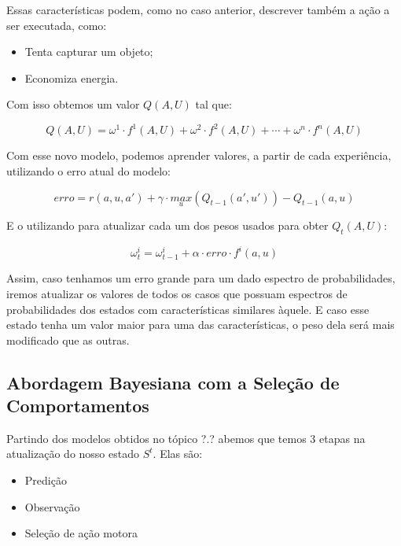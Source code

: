 Essas características podem, como no caso anterior, descrever também a ação a ser executada, como:

\begin{itemize}
	\item Tenta capturar um objeto;
	\item Economiza energia.
\end{itemize}

Com isso obtemos um valor $ Q \left( A, U \right) $ tal que:

\begin{equation}
	Q \left( A, U \right) = \omega^1 \cdot f^1 \left( A, U \right) + \omega^2 \cdot f^2 \left( A, U \right) + \cdots + \omega^n \cdot f^n \left( A, U \right)
\end{equation}


Com esse novo modelo, podemos aprender valores, a partir de cada experiência, utilizando o erro atual do modelo:

\begin{equation}
	erro = r \left( a, u, a' \right) + \gamma \cdot \underset{u}{max} \left( Q_{t-1} \left( a', u' \right) \right) - Q_{t-1} \left( a, u \right)
\end{equation}

E o utilizando para atualizar cada um dos pesos usados para obter $ Q_t \left( A, U \right) $:

\begin{equation}
	\omega_t^i = \omega_{t-1}^i + \alpha \cdot erro \cdot f^i \left( a, u \right)
\end{equation}

Assim, caso tenhamos um erro grande para um dado espectro de probabilidades, iremos atualizar os valores de todos os casos que possuam espectros de probabilidades dos estados com características similares àquele. E caso esse estado tenha um valor maior para uma das características, o peso dela será mais modificado que as outras.


\subsection{Abordagem Bayesiana com a Seleção de Comportamentos}

Partindo dos modelos obtidos no tópico ?.? abemos que temos 3 etapas na atualização do nosso estado $ S^t $. Elas são:

\begin{itemize}
	\item Predição
	\item Observação
	\item Seleção de ação motora
\end{itemize}

